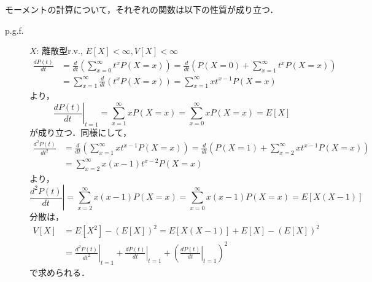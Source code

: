 \documentclass{jsreport}
\begin{document}
モーメントの計算について，それぞれの関数は以下の性質が成り立つ．
\begin{description}
  \item[p.g.f.]
  $X$: 離散型r.v., $E[X] < \infty, V[X] < \infty$
  \begin{align}
    \frac{dP(t)}{dt} &= \frac{d}{dt} \left(\sum_{x = 0}^{\infty} t^x P(X = x) \right) = \frac{d}{dt} \left(P(X = 0) + \sum_{x=1}^{\infty} t^x P(X = x)\right) \nonumber \\
    &= \sum_{x=1}^{\infty} \frac{d}{dt} (t^x P(X = x)) = \sum_{x = 1}^{\infty} x t^{x - 1} P(X = x) \nonumber
  \end{align}
  より，
  \begin{equation}
    \left.\frac{dP(t)}{dt}\right|_{t = 1} = \sum_{x = 1}^{\infty} xP(X = x) = \sum_{x = 0}^{\infty} xP(X = x) = E[X] \nonumber
  \end{equation}
  が成り立つ．同様にして，
  \begin{align}
    \frac{d^2P(t)}{dt^2} &= \frac{d}{dt} \left(\sum_{x = 1}^{\infty} x t^{x - 1} P(X = x)\right) = \frac{d}{dt} \left(P(X = 1) + \sum_{x = 2}^{\infty} xt^{x - 1} P(X = x)\right) \nonumber \\
    &= \sum_{x = 2}^{\infty} x(x - 1)t^{x - 2} P(X = x) \nonumber
  \end{align}
  より，
  \begin{equation}
    \left.\frac{d^2P(t)}{dt}\right| = \sum_{x = 2}^{\infty} x(x - 1)P(X = x) = \sum_{x = 0}^{\infty} x(x - 1)P(X = x) = E[X(X - 1)] \nonumber
  \end{equation}
  分散は，
  \begin{align}
    V[X] &= E[X^2] - (E[X])^2 = E[X(X - 1)] + E[X] - (E[X])^2 \nonumber \\
    &= \left.\frac{d^2 P(t)}{dt^2}\right|_{t = 1} + \left.\frac{d P(t)}{dt}\right|_{t = 1} + \left(\left.\frac{d P(t)}{dt}\right|_{t = 1}\right)^2 \nonumber
  \end{align}
  で求められる．


\end{description}
\end{document}
